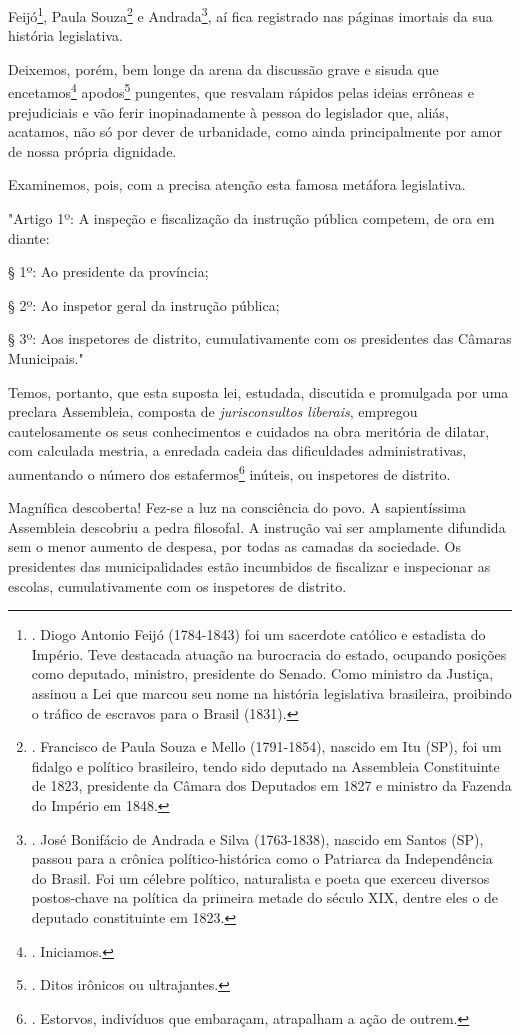 Feijó\footnote{. Diogo Antonio Feijó (1784-1843) foi um sacerdote
  católico e estadista do Império. Teve destacada atuação na burocracia
  do estado, ocupando posições como deputado, ministro, presidente do
  Senado. Como ministro da Justiça, assinou a Lei que marcou seu nome na
  história legislativa brasileira, proibindo o tráfico de escravos para
  o Brasil (1831).}, Paula Souza\footnote{. Francisco de Paula Souza e
  Mello (1791-1854), nascido em Itu (SP), foi um fidalgo e político
  brasileiro, tendo sido deputado na Assembleia Constituinte de 1823,
  presidente da Câmara dos Deputados em 1827 e ministro da Fazenda do
  Império em 1848.} e Andrada\footnote{. José Bonifácio de Andrada e
  Silva (1763-1838), nascido em Santos (SP), passou para a crônica
  político-histórica como o Patriarca da Independência do Brasil. Foi um
  célebre político, naturalista e poeta que exerceu diversos
  postos-chave na política da primeira metade do século XIX, dentre eles
  o de deputado constituinte em 1823.}, aí fica registrado nas páginas
imortais da sua história legislativa.

Deixemos, porém, bem longe da arena da discussão grave e sisuda que
encetamos\footnote{. Iniciamos.} apodos\footnote{. Ditos irônicos ou
  ultrajantes.} pungentes, que resvalam rápidos pelas ideias errôneas e
prejudiciais e vão ferir inopinadamente à pessoa do legislador que,
aliás, acatamos, não só por dever de urbanidade, como ainda
principalmente por amor de nossa própria dignidade.

Examinemos, pois, com a precisa atenção esta famosa metáfora
legislativa.

"Artigo 1º: A inspeção e fiscalização da instrução pública competem, de
ora em diante:

§ 1º: Ao presidente da província;

§ 2º: Ao inspetor geral da instrução pública;

§ 3º: Aos inspetores de distrito, cumulativamente com os presidentes das
Câmaras Municipais."

Temos, portanto, que esta suposta lei, estudada, discutida e promulgada
por uma preclara Assembleia, composta de \emph{jurisconsultos liberais},
empregou cautelosamente os seus conhecimentos e cuidados na obra
meritória de dilatar, com calculada mestria, a enredada cadeia das
dificuldades administrativas, aumentando o número dos
estafermos\footnote{. Estorvos, indivíduos que embaraçam, atrapalham a
  ação de outrem.} inúteis, ou inspetores de distrito.

Magnífica descoberta! Fez-se a luz na consciência do povo. A
sapientíssima Assembleia descobriu a pedra filosofal. A instrução vai
ser amplamente difundida sem o menor aumento de despesa, por todas as
camadas da sociedade. Os presidentes das municipalidades estão
incumbidos de fiscalizar e inspecionar as escolas, cumulativamente com
os inspetores de distrito.

